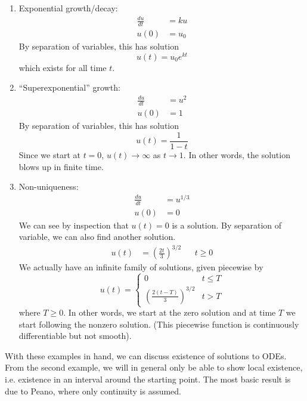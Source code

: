 \documentclass[12pt]{amsart}         %
\theoremstyle{remark}
\begin{document}
\begin{enumerate}
\item Exponential growth/decay:
\begin{align*}
\frac{du}{dt} &= k u \\
u(0) &= u_0 
\end{align*}
By separation of variables, this has solution
\[
u(t) = u_0 e^{kt}
\]
which exists for all time $t$.

\item ``Superexponential'' growth:
\begin{align*}
\frac{du}{dt} &= u^2 \\
u(0) &= 1
\end{align*}
By separation of variables, this has solution
\[
u(t) = \frac{1}{1 - t}
\]
Since we start at $t = 0$, $u(t) \rightarrow \infty$ as $t \rightarrow 1$. In other words, the solution blows up in finite time.

\item Non-uniqueness:
\begin{align*}
\frac{du}{dt} &= u^{1/3} \\
u(0) &= 0
\end{align*}
We can see by inspection that $u(t) = 0$ is a solution. By separation of variable, we can also find another solution.
\begin{align*}
u(t) &= \left( \frac{2t}{3} \right)^{3/2} && t \geq 0
\end{align*}
We actually have an infinite family of solutions, given piecewise by
\[
u(t) = \begin{cases}
0 & t \leq T \\
\left( \frac{2(t-T)}{3} \right)^{3/2} & t > T
\end{cases}
\]
where $T \geq 0$. In other words, we start at the zero solution and at time $T$ we start following the nonzero solution. (This piecewise function is continuously differentiable but not smooth).
\end{enumerate}

With these examples in hand, we can discuss existence of solutions to ODEs. From the second example, we will in general only be able to show local existence, i.e. existence in an interval around the starting point. The most basic result is due to Peano, where only continuity is assumed. 
\end{document}
